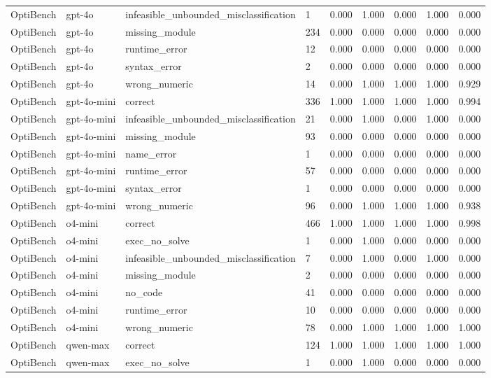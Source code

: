 \begin{table}[t]
\begin{tabular}{lllllllll}
OptiBench & gpt-4o & infeasible\_unbounded\_misclassification & 1 & 0.000 & 1.000 & 0.000 & 1.000 & 0.000 \\
OptiBench & gpt-4o & missing\_module & 234 & 0.000 & 0.000 & 0.000 & 0.000 & 0.000 \\
OptiBench & gpt-4o & runtime\_error & 12 & 0.000 & 0.000 & 0.000 & 0.000 & 0.000 \\
OptiBench & gpt-4o & syntax\_error & 2 & 0.000 & 0.000 & 0.000 & 0.000 & 0.000 \\
OptiBench & gpt-4o & wrong\_numeric & 14 & 0.000 & 1.000 & 1.000 & 1.000 & 0.929 \\
OptiBench & gpt-4o-mini & correct & 336 & 1.000 & 1.000 & 1.000 & 1.000 & 0.994 \\
OptiBench & gpt-4o-mini & infeasible\_unbounded\_misclassification & 21 & 0.000 & 1.000 & 0.000 & 1.000 & 0.000 \\
OptiBench & gpt-4o-mini & missing\_module & 93 & 0.000 & 0.000 & 0.000 & 0.000 & 0.000 \\
OptiBench & gpt-4o-mini & name\_error & 1 & 0.000 & 0.000 & 0.000 & 0.000 & 0.000 \\
OptiBench & gpt-4o-mini & runtime\_error & 57 & 0.000 & 0.000 & 0.000 & 0.000 & 0.000 \\
OptiBench & gpt-4o-mini & syntax\_error & 1 & 0.000 & 0.000 & 0.000 & 0.000 & 0.000 \\
OptiBench & gpt-4o-mini & wrong\_numeric & 96 & 0.000 & 1.000 & 1.000 & 1.000 & 0.938 \\
OptiBench & o4-mini & correct & 466 & 1.000 & 1.000 & 1.000 & 1.000 & 0.998 \\
OptiBench & o4-mini & exec\_no\_solve & 1 & 0.000 & 1.000 & 0.000 & 0.000 & 0.000 \\
OptiBench & o4-mini & infeasible\_unbounded\_misclassification & 7 & 0.000 & 1.000 & 0.000 & 1.000 & 0.000 \\
OptiBench & o4-mini & missing\_module & 2 & 0.000 & 0.000 & 0.000 & 0.000 & 0.000 \\
OptiBench & o4-mini & no\_code & 41 & 0.000 & 0.000 & 0.000 & 0.000 & 0.000 \\
OptiBench & o4-mini & runtime\_error & 10 & 0.000 & 0.000 & 0.000 & 0.000 & 0.000 \\
OptiBench & o4-mini & wrong\_numeric & 78 & 0.000 & 1.000 & 1.000 & 1.000 & 1.000 \\
OptiBench & qwen-max & correct & 124 & 1.000 & 1.000 & 1.000 & 1.000 & 1.000 \\
OptiBench & qwen-max & exec\_no\_solve & 1 & 0.000 & 1.000 & 0.000 & 0.000 & 0.000 \\

\end{tabular}
\end{table}
